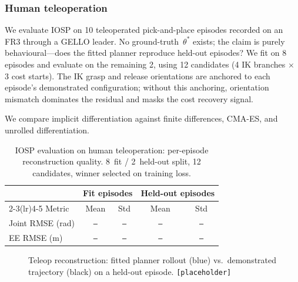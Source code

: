 

\subsubsection{Human teleoperation}
\label{sec:exp_teleop}

We evaluate IOSP on 10 teleoperated pick-and-place episodes recorded on an FR3 through a GELLO leader.
No ground-truth~$\theta^*$ exists; the claim is purely behavioural---does the fitted planner reproduce held-out episodes?
We fit on 8 episodes and evaluate on the remaining 2, using 12 candidates (4 IK branches $\times$ 3 cost starts).
The IK grasp and release orientations are anchored to each episode's demonstrated configuration; without this anchoring, orientation mismatch dominates the residual and masks the cost recovery signal.

We compare implicit differentiation against finite differences, CMA-ES, and unrolled differentiation.



\begin{table}[t]
\centering
\small
\caption{IOSP evaluation on human teleoperation: per-episode reconstruction quality. 8~fit / 2~held-out split, 12 candidates, winner selected on training loss.}
\label{tab:teleop_perepisode}
\begin{tabular}{lcccc}
\toprule
& \multicolumn{2}{c}{Fit episodes} & \multicolumn{2}{c}{Held-out episodes} \\
\cmidrule(lr){2-3}\cmidrule(lr){4-5}
Metric & Mean & Std & Mean & Std \\
\midrule
Joint RMSE (rad) & \texttt{--} & \texttt{--} & \texttt{--} & \texttt{--} \\
EE RMSE (m)      & \texttt{--} & \texttt{--} & \texttt{--} & \texttt{--} \\
\bottomrule
\end{tabular}
\end{table}

\begin{figure}[t]
    \centering
    \caption{Teleop reconstruction: fitted planner rollout (blue) vs.\ demonstrated trajectory (black) on a held-out episode. \texttt{[placeholder]}}
    \label{fig:teleop_reconstruction}
\end{figure}
